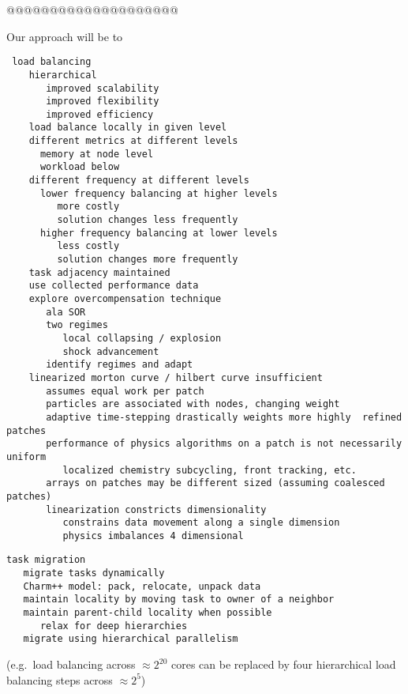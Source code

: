 \documentclass{article}
\begin{document}
@@@@@@@@@@@@@@@@@@@@

Our approach will be to 

\begin{verbatim}
 load balancing
    hierarchical
       improved scalability
       improved flexibility
       improved efficiency
    load balance locally in given level
    different metrics at different levels
      memory at node level
      workload below
    different frequency at different levels
      lower frequency balancing at higher levels
         more costly
         solution changes less frequently
      higher frequency balancing at lower levels
         less costly
         solution changes more frequently
    task adjacency maintained
    use collected performance data
    explore overcompensation technique
       ala SOR
       two regimes
          local collapsing / explosion
          shock advancement
       identify regimes and adapt
    linearized morton curve / hilbert curve insufficient
       assumes equal work per patch
       particles are associated with nodes, changing weight
       adaptive time-stepping drastically weights more highly  refined patches
       performance of physics algorithms on a patch is not necessarily uniform
          localized chemistry subcycling, front tracking, etc.
       arrays on patches may be different sized (assuming coalesced patches)
       linearization constricts dimensionality
          constrains data movement along a single dimension
          physics imbalances 4 dimensional
\end{verbatim}

\begin{verbatim}
task migration
   migrate tasks dynamically
   Charm++ model: pack, relocate, unpack data
   maintain locality by moving task to owner of a neighbor
   maintain parent-child locality when possible
      relax for deep hierarchies
   migrate using hierarchical parallelism
\end{verbatim}

(e.g.~load balancing
across $\approx 2^20$ cores can be replaced by four hierarchical
load balancing steps across $\approx 2^5$)
\end{document}
